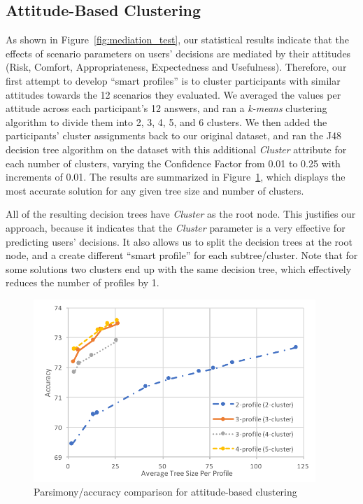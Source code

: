 \subsection{Attitude-Based Clustering}
As shown in Figure~\ref{fig:mediation_test}, our statistical results indicate that the effects of scenario parameters on users' decisions are mediated by their attitudes (Risk, Comfort, Appropriateness, Expectedness and Usefulness). Therefore, our first attempt to develop ``smart profiles'' is to cluster participants with similar attitudes towards the 12 scenarios they evaluated. We averaged the values per attitude across each participant's 12 answers, and ran a \textit{k-means} clustering algorithm to divide them into 2, 3, 4, 5, and 6 clusters. We then added the participants' cluster assignments back to our original dataset, and ran the J48 decision tree algorithm on the dataset with this additional \emph{Cluster} attribute for each number of clusters, varying the Confidence Factor from 0.01 to 0.25 with increments of 0.01. The results are summarized in Figure~\ref{fig:attitudesum}, which displays the most accurate solution for any given tree size and number of clusters.


All of the resulting decision trees have \emph{Cluster} as the root node. This justifies our approach, because it indicates that the \emph{Cluster} parameter is a very effective for predicting users' decisions. It also allows us to split the decision trees at the root node, and a create different ``smart profile'' for each subtree/cluster. Note that for some solutions two clusters end up with the same decision tree, which effectively reduces the number of profiles by 1.

\begin{figure}
	\centering
	\includegraphics[width=0.95\textwidth]{figures/attitudeSum2.pdf}
	\caption{Parsimony/accuracy comparison for attitude-based clustering}
	\label{fig:attitudesum}
\end{figure}

